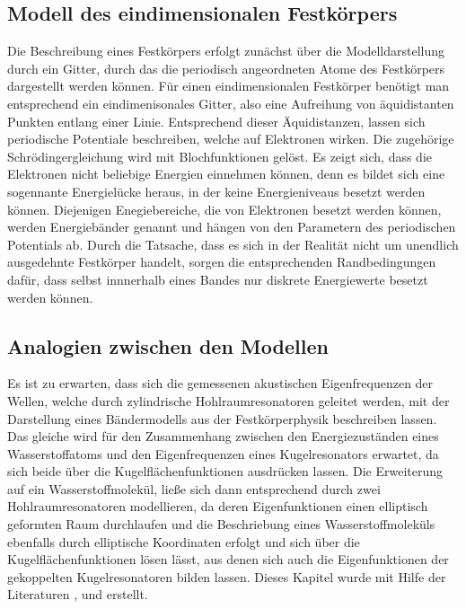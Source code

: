 \subsection{Modell des eindimensionalen Festkörpers}
Die Beschreibung eines Festkörpers erfolgt zunächst über die Modelldarstellung durch ein 
Gitter, durch das die periodisch angeordneten Atome des Festkörpers dargestellt werden können.
Für einen eindimensionalen Festkörper benötigt man entsprechend ein eindimenisonales Gitter,
also eine Aufreihung von äquidistanten Punkten entlang einer Linie.
Entsprechend dieser Äquidistanzen, lassen sich periodische Potentiale beschreiben, 
welche auf Elektronen wirken. Die zugehörige Schrödingergleichung wird mit 
Blochfunktionen gelöst. Es zeigt sich, dass die Elektronen nicht beliebige Energien 
einnehmen können, denn es bildet sich eine sogennante Energielücke heraus, in der 
keine Energieniveaus besetzt werden können.
Diejenigen Enegiebereiche, die von Elektronen besetzt werden können, werden Energiebänder 
genannt und hängen von den Parametern des periodischen Potentials ab. Durch die 
Tatsache, dass es sich in der Realität nicht um unendlich ausgedehnte Festkörper handelt, 
sorgen die entsprechenden Randbedingungen dafür, dass selbst innnerhalb eines Bandes 
nur diskrete Energiewerte besetzt werden können.

\newpage
\subsection{Analogien zwischen den Modellen}
Es ist zu erwarten, dass sich die gemessenen akustischen Eigenfrequenzen der Wellen,
welche durch zylindrische Hohlraumresonatoren geleitet werden, mit der Darstellung eines
Bändermodells aus der Festkörperphysik beschreiben lassen.
Das gleiche wird für den Zusammenhang zwischen den Energiezuständen eines 
Wasserstoffatoms und den Eigenfrequenzen eines Kugelresonators erwartet, 
da sich beide über die 
Kugelflächenfunktionen ausdrücken lassen.
Die Erweiterung auf ein Wasserstoffmolekül, ließe sich dann entsprechend durch 
zwei Hohlraumresonatoren modellieren, da deren Eigenfunktionen einen elliptisch 
geformten Raum durchlaufen und die Beschriebung eines Wasserstoffmoleküls ebenfalls 
durch elliptische Koordinaten erfolgt und sich über die Kugelflächenfunktionen
lösen lässt, aus denen sich auch die Eigenfunktionen der gekoppelten Kugelresonatoren 
bilden lassen. 
Dieses Kapitel wurde mit Hilfe der Literaturen
\cite{sample},
\cite{dem1} und
\cite{dem3} erstellt. 
\newpage